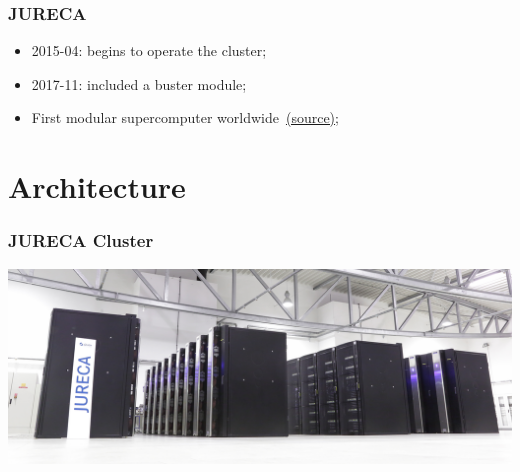 \documentclass{beamer}
\begin{document}
\begin{frame}
  \frametitle{JURECA}
  \begin{itemize}
    \item 2015-04: begins to operate the cluster;
    \item 2017-11: included a buster module;
    \item First modular supercomputer worldwide~\href{https://www.fz-juelich.de/SharedDocs/Pressemitteilungen/UK/EN/2017/2017-11-13-jureca-booster.html}{(source)};
  \end{itemize}
\end{frame}


\section{Architecture}

\begin{frame}
  \frametitle{JURECA Cluster}
  \includegraphics[width=\textwidth]{./images/jureca-cluster.jpeg}
\end{frame}
\end{document}
